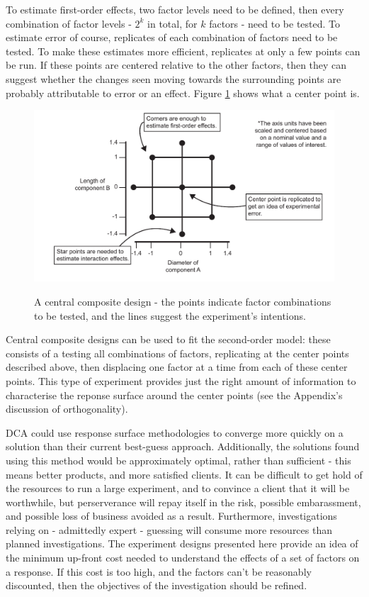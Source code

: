 \documentclass[11pt,a4paper,article]{memoir} %
\begin{document}
To estimate first-order effects, two factor levels need to be defined, then every combination of factor levels - $2^k$ in total, for $k$ factors - need to be tested.  To estimate error of course, replicates of each combination of factors need to be tested. To make these estimates more efficient, replicates at only a few points can be run. If these points are centered relative to the other factors, then they can suggest whether the changes seen moving towards the surrounding points are probably attributable to error or an effect. Figure \ref{fig:centered_points} shows what a center point is.
\begin{figure}[h!]
\includegraphics[width=\textwidth]{central_composite_design.pdf}
\label{fig:centered_points}
\caption{A central composite design - the points indicate factor combinations to be tested, and the lines suggest the experiment's intentions.}
\end{figure}

Central composite designs can be used to fit the second-order model: these consists of a testing all combinations of factors, replicating at the center points described above, then displacing one factor at a time from each of these center points. This type of experiment provides just the right amount of information to characterise the reponse surface around the center points (see the Appendix's discussion of orthogonality).


 DCA could use response surface methodologies to converge more quickly on a solution than their current best-guess approach. Additionally, the solutions found using this method would be approximately optimal, rather than sufficient - this means better products, and more satisfied clients. It can be difficult to get hold of the resources to run a large experiment, and to convince a client that it will be worthwhile, but perserverance will repay itself in the risk, possible embarassment, and possible loss of business avoided as a result. Furthermore, investigations relying on - admittedly expert - guessing will consume more resources than planned investigations. The experiment designs presented here provide an idea of the minimum up-front cost needed to understand the effects of a set of factors on a response. If this cost is too high, and the factors can't be reasonably discounted, then the objectives of the investigation should be refined.
\end{document}
